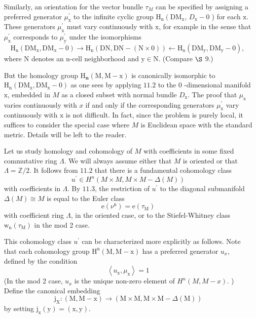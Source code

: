 \documentclass[10pt]{article}
\begin{document}
Similarly, an orientation for the vector bundle $\tau_{M}$ can be specified by assigning a preferred generator $\mu_{\mathrm{x}}^{\prime}$ to the infinite cyclic group $\mathrm{H}_{\mathrm{n}}\left(\mathrm{DM}_{\mathrm{x}}\right.$, $D_{\mathrm{x}}-0$ ) for each $\mathrm{x}$. These generators $\mu_{\mathrm{x}}^{\prime}$ must vary continuously with $\mathrm{x}$, for example in the sense that $\mu_{\mathrm{x}}^{\prime}$ corresponds to $\mu_{\mathrm{y}}^{\prime}$ under the isomorphisms
$$
\mathrm{H}_{\mathrm{n}}\left(\mathrm{DM}_{\mathrm{x}}, \mathrm{DM}_{\mathrm{x}}-0\right) \rightarrow \mathrm{H}_{\mathrm{n}}(\mathrm{DN}, \mathrm{DN}-(\mathrm{N} \times 0)) \leftarrow \mathrm{H}_{\mathrm{n}}\left(\mathrm{DM}_{\mathrm{y}}, \mathrm{DM}_{\mathrm{y}}-0\right) \text {, }
$$
where $\mathrm{N}$ denotes an $\mathrm{n}$-cell neighborhood and $\mathrm{y} \in \mathrm{N}$. (Compare $\S$ 9.)

But the homology group $\mathrm{H}_{\mathbf{n}}(\mathrm{M}, \mathrm{M}-\mathrm{x})$ is canonically isomorphic to $\mathrm{H}_{\mathrm{n}}\left(\mathrm{DM}_{\mathrm{x}}, \mathrm{DM}_{\mathrm{x}}-0\right)$ as one sees by applying $11.2$ to the 0 -dimensional manifold $\mathrm{x}$, embedded in $M$ as a closed subset with normal bundle $D_{\mathrm{x}}$. The proof that $\mu_{\mathrm{x}}$ varies continuously with $x$ if and only if the corresponding generators $\mu_{\mathrm{x}}^{\prime}$ vary continuously with $\mathrm{x}$ is not difficult. In fact, since the problem is purely local, it suffices to consider the special case where $M$ is Euclidean space with the standard metric. Details will be left to the reader.

Let us study homology and cohomology of $M$ with coefficients in some fixed commutative ring $\Lambda$. We will always assume either that $M$ is oriented or that $\Lambda=\mathbb{Z} / 2$. It follows from $11.2$ that there is a fundamental cohomology class
$$
u^{\prime} \in H^{n}(M \times M, M \times M-\Delta(M))
$$
with coefficients in $\Lambda$. By $11.3$, the restriction of $u^{\prime}$ to the diagonal submanifold $\Delta(M) \cong M$ is equal to the Euler class
$$
\mathrm{e}\left(\nu^{\mathrm{n}}\right)=\mathrm{e}\left(\tau_{\mathrm{M}}\right)
$$
with coefficient ring $\Lambda$, in the oriented case, or to the Stiefel-Whitney class $\mathrm{w}_{\mathrm{n}}\left(\tau_{\mathrm{M}}\right)$ in the mod 2 case.

This cohomology class $u^{\prime}$ can be characterized more explicitly as follows. Note that each cohomology group $\mathrm{H}^{\mathrm{n}}(\mathrm{M}, \mathrm{M}-\mathrm{x})$ has a preferred generator $u_{x}$, defined by the condition
$$
\left\langle u_{\mathrm{x}}, \mu_{\mathrm{x}}\right\rangle=1
$$
(In the mod 2 case, $u_{x}$ is the unique non-zero element of $H^{n}(M, M-x) .$ ) Define the canonical embedding
$$
\mathrm{j}_{\mathrm{X}}:(\mathrm{M}, \mathrm{M}-\mathrm{x}) \rightarrow(\mathrm{M} \times \mathrm{M}, \mathrm{M} \times \mathrm{M}-\Delta(\mathrm{M}))
$$
by setting $\mathrm{j}_{\mathrm{x}}(\mathrm{y})=(\mathrm{x}, \mathrm{y})$.
\end{document}
